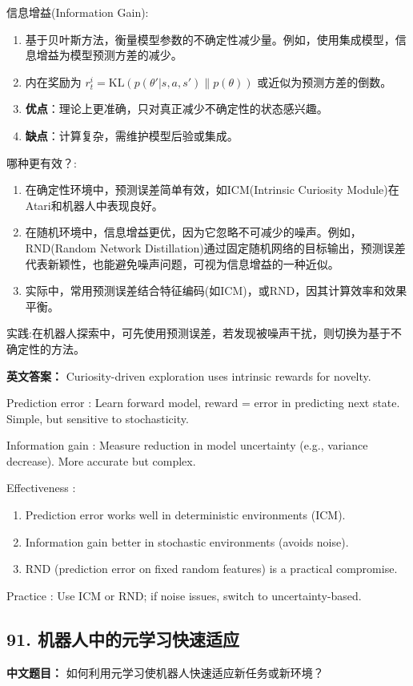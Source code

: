 \documentclass[10pt,a4paper]{ctexart}
\begin{document}
 信息增益(Information Gain):
\begin{enumerate}
    \item 基于贝叶斯方法，衡量模型参数的不确定性减少量。例如，使用集成模型，信息增益为模型预测方差的减少。
    \item 内在奖励为 \(r^i_t = \text{KL}(p(\theta'|s,a,s') \| p(\theta))\) 或近似为预测方差的倒数。
    \item \textbf{优点}：理论上更准确，只对真正减少不确定性的状态感兴趣。
    \item \textbf{缺点}：计算复杂，需维护模型后验或集成。
\end{enumerate}

 哪种更有效？:
\begin{enumerate}
    \item 在确定性环境中，预测误差简单有效，如ICM(Intrinsic Curiosity Module)在Atari和机器人中表现良好。
    \item 在随机环境中，信息增益更优，因为它忽略不可减少的噪声。例如，RND(Random Network Distillation)通过固定随机网络的目标输出，预测误差代表新颖性，也能避免噪声问题，可视为信息增益的一种近似。
    \item 实际中，常用预测误差结合特征编码(如ICM)，或RND，因其计算效率和效果平衡。
\end{enumerate}

 实践:在机器人探索中，可先使用预测误差，若发现被噪声干扰，则切换为基于不确定性的方法。

\textbf{英文答案：}  
Curiosity-driven exploration uses intrinsic rewards for novelty.

 Prediction error : Learn forward model, reward = error in predicting next state. Simple, but sensitive to stochasticity.

 Information gain : Measure reduction in model uncertainty (e.g., variance decrease). More accurate but complex.

 Effectiveness :
\begin{enumerate}
    \item Prediction error works well in deterministic environments (ICM).
    \item Information gain better in stochastic environments (avoids noise).
    \item RND (prediction error on fixed random features) is a practical compromise.
\end{enumerate}

 Practice : Use ICM or RND; if noise issues, switch to uncertainty-based.

\subsection*{91. 机器人中的元学习快速适应}
\textbf{中文题目：} 如何利用元学习使机器人快速适应新任务或新环境？
\end{document}
